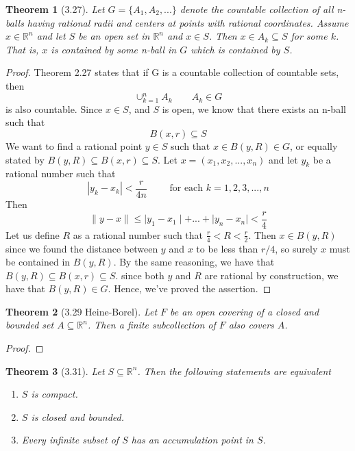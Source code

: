 \documentclass[aps,pra,notitlepage,amsmath,amssymb,letterpaper,12pt]{revtex4-1}
\newtheorem{theorem}{Theorem}
\begin{document}
\begin{theorem}[3.27] \nonumber
Let $G = \{A_{1},A_{2},...\}$ denote the countable collection of all n-balls having rational radii and centers at points with rational coordinates. Assume $x \in \mathbb{R}^n$ and let $S$ be an open set in $\mathbb{R}^n$ and $x \in S$. Then $x \in A_{k} \subseteq S$ for some $k$. That is, $x$ is contained by some n-ball in $G$ which is contained by $S$.
\end{theorem}
\begin{proof}
Theorem 2.27 states that if G is a countable collection of countable sets, then
\[\cup_{k=1}^{n} A_{k} \qquad A_{k} \in G\]
is also countable. Since $x \in S$, and $S$ is open, we know that there exists an n-ball such that
\[B(x,r) \subseteq S\]
We want to find a rational point $y\in S$ such that $x \in B(y,R) \in G$, or equally stated by $B(y,R) \subseteq B(x,r) \subseteq S$. Let
$x=(x_{1},x_{2},...,x_{n})$ and let $y_{k}$ be a rational number such that
\[\left| y_{k} - x_{k} \right| < \frac{r}{4n} \qquad \textrm{ for each } k=1,2,3,...,n\]
Then
\[\|y-x\| \leq \mid y_{1}-x_{1} \mid + ... + \mid y_{n}-x_{n} \mid < \frac{r}{4}\]
Let us define $R$ as a rational number such that $\frac{r}{4} < R < \frac{r}{2}$. Then
$x \in B(y,R)$ since we found the distance between $y$ and $x$ to be less than $r/4$, so surely $x$ must be contained in $B(y,R)$. By the same reasoning, we have that $B(y,R) \subseteq B(x,r) \subseteq S$. since both $y$ and $R$ are rational by construction, we have that $B(y,R) \in G$. Hence, we've proved the assertion.
\end{proof}


\begin{theorem}[3.29 Heine-Borel]
Let $F$ be an open covering of a closed and bounded set $A \subseteq \mathbb{R}^n$. Then a finite subcollection of $F$ also covers $A$.
\end{theorem}

\begin{proof}
\end{proof}


\begin{theorem}[3.31]
Let $S \subseteq \mathbb{R}^n$. Then the following statements are equivalent
\begin{enumerate}[\upshape a)]
  \item $S$ is compact. %
  \item $S$ is closed and bounded.
  \item Every infinite subset of $S$ has an accumulation point in $S$.
\end{enumerate}
\end{theorem}
\end{document}
